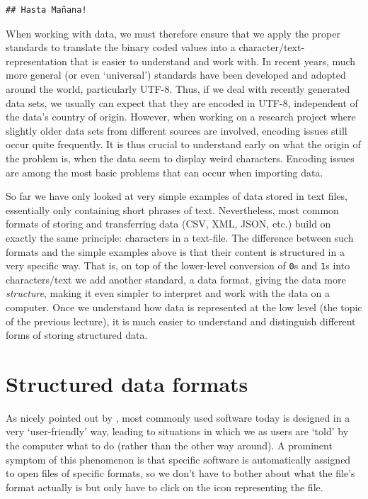 \documentclass[
  12pt,
]{style/krantz}
\begin{document}
\begin{verbatim}
## Hasta Mañana!
\end{verbatim}

When working with data, we must therefore ensure that we apply the proper standards to translate the binary coded values into a character/text-representation that is easier to understand and work with. In recent years, much more general (or even `universal') standards have been developed and adopted around the world, particularly UTF-8. Thus, if we deal with recently generated data sets, we usually can expect that they are encoded in UTF-8, independent of the data's country of origin. However, when working on a research project where slightly older data sets from different sources are involved, encoding issues still occur quite frequently. It is thus crucial to understand early on what the origin of the problem is, when the data seem to display weird characters. Encoding issues are among the most basic problems that can occur when importing data.

So far we have only looked at very simple examples of data stored in text files, essentially only containing short phrases of text. Nevertheless, most common formats of storing and transferring data (CSV, XML, JSON, etc.) build on exactly the same principle: characters in a text-file. The difference between such formats and the simple examples above is that their content is structured in a very specific way. That is, on top of the lower-level conversion of \texttt{0}s and \texttt{1}s into characters/text we add another standard, a data format, giving the data more \emph{structure}, making it even simpler to interpret and work with the data on a computer. Once we understand how data is represented at the low level (the topic of the previous lecture), it is much easier to understand and distinguish different forms of storing structured data.

\hypertarget{structured-data-formats}{%
\section{Structured data formats}\label{structured-data-formats}}

As nicely pointed out by \citet{murrell_2009}, most commonly used software today is designed in a very `user-friendly' way, leading to situations in which we as users are `told' by the computer what to do (rather than the other way around). A prominent symptom of this phenomenon is that specific software is automatically assigned to open files of specific formats, so we don't have to bother about what the file's format actually is but only have to click on the icon representing the file.
\end{document}

